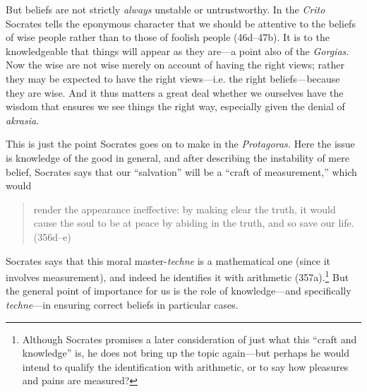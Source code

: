 ﻿\documentclass[11pt]{amsart}
\begin{document}
 
But beliefs are not strictly \emph{always} unstable or untrustworthy. In the \emph{Crito} Socrates tells the eponymous character that we should be attentive to the beliefs of wise people rather than to those of foolish people (46d--47b). It is to the knowledgeable that things will appear as they are---a point also of the \emph{Gorgias.} Now the wise are not wise merely on account of having the right views; rather they may be expected to have the right views---i.e. the right beliefs---because they are wise. And it thus matters a great deal whether we ourselves have the wisdom that ensures we see things the right way, especially given the denial of \emph{akrasia}.


This is just the point Socrates goes on to make in the \emph{Protagoras.} Here the issue is knowledge of the good in general, and after describing the instability of mere belief, Socrates says that our ``salvation'' will be a ``craft of measurement,'' which would \small\begin{quote} render the appearance ineffective: by making clear the truth, it would cause the soul to be at peace by abiding in the truth, and so save our life. (356d--e)\end{quote}\normalsize Socrates says that this moral master-\emph{techne} is a mathematical one (since it involves measurement), and indeed he identifies it with arithmetic (357a).\footnote{Although Socrates promises a later consideration of just what this ``craft and knowledge'' is, he does not bring up the topic again---but perhaps he would intend to qualify the identification with arithmetic, or to say how pleasures and pains are measured?} But the general point of importance for us is the role of knowledge---and specifically \emph{techne}---in ensuring correct beliefs in particular cases.
\end{document}
